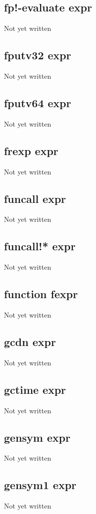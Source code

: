 \documentclass[a4paper,11pt]{article}
\begin{document}
\subsection{\ttfamily fp!-evaluate expr}
Not yet written

\subsection{\ttfamily fputv32 expr}
Not yet written

\subsection{\ttfamily fputv64 expr}
Not yet written

\subsection{\ttfamily frexp expr}
Not yet written

\subsection{\ttfamily funcall expr}
Not yet written

\subsection{\ttfamily funcall!* expr}
Not yet written

\subsection{\ttfamily function fexpr}
Not yet written

\subsection{\ttfamily gcdn expr}
Not yet written

\subsection{\ttfamily gctime expr}
Not yet written

\subsection{\ttfamily gensym expr}
Not yet written

\subsection{\ttfamily gensym1 expr}
Not yet written
\end{document}
